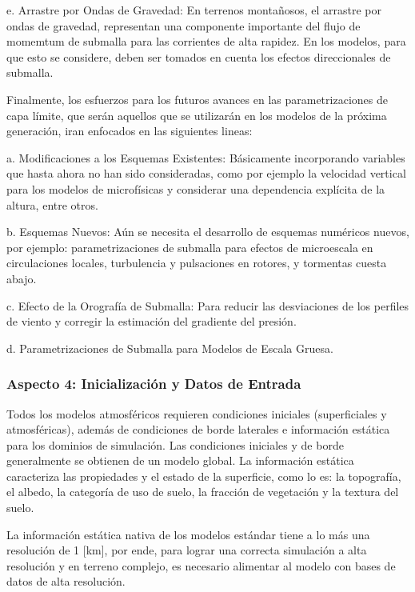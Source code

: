 \begin{enumerate*}
	\item[e.] Arrastre por Ondas de Gravedad: En terrenos montañosos, el arrastre por ondas de gravedad, representan una componente importante del flujo de momemtum de submalla para las corrientes de alta rapidez. En los modelos, para que esto se considere, deben ser tomados en cuenta los efectos direccionales de submalla.
\end{enumerate*}

Finalmente, los esfuerzos para los futuros avances en las parametrizaciones de capa límite, que serán aquellos que se utilizarán en los modelos de la próxima generación, iran enfocados en las siguientes lineas:
\begin{enumerate*}
	\item[a.] Modificaciones a los Esquemas Existentes: Básicamente incorporando variables que hasta ahora no han sido consideradas, como por ejemplo la velocidad vertical para los modelos de microfísicas y considerar una dependencia explícita de la altura, entre otros.
	\item[b.] Esquemas Nuevos: Aún se necesita el desarrollo de esquemas numéricos nuevos, por ejemplo: parametrizaciones de submalla para efectos de microescala en circulaciones locales, turbulencia y pulsaciones en rotores, y tormentas cuesta abajo.
	\item[c.] Efecto de la Orografía de Submalla: Para reducir las desviaciones de los perfiles de viento y corregir la estimación del gradiente del presión.
	\item[d.] Parametrizaciones de Submalla para Modelos de Escala Gruesa.
\end{enumerate*}

\subsubsection{Aspecto 4: Inicialización y Datos de Entrada}
Todos los modelos atmosféricos requieren condiciones iniciales (superficiales y atmosféricas), además de condiciones de borde laterales e información estática para los dominios de simulación. Las condiciones iniciales y de borde generalmente se obtienen de un modelo global. La información estática caracteriza las propiedades y el estado de la superficie, como lo es: la topografía, el albedo, la categoría de uso de suelo, la fracción de vegetación y la textura del suelo.

La información estática nativa de los modelos estándar tiene a lo más una resolución de 1 [km], por ende, para lograr una correcta simulación a alta resolución y en terreno complejo, es necesario alimentar al modelo con bases de datos de alta resolución.

